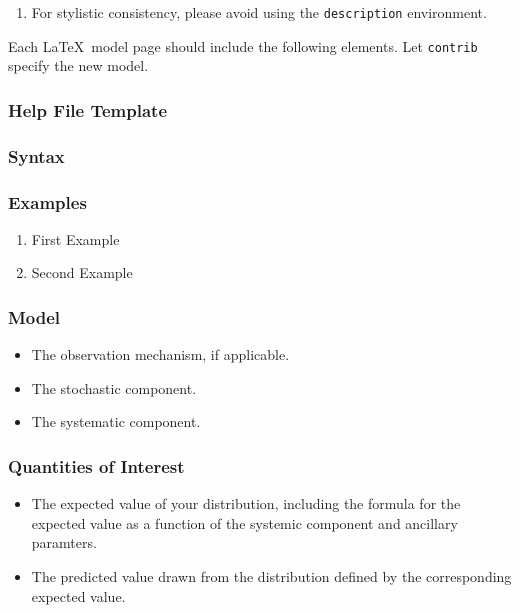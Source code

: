 \begin{description}
\begin{itemize}
\begin{enumerate}
		\item For stylistic consistency, please avoid using the {\tt description} environment.

\end{enumerate}



Each \LaTeX\ model page should include the following elements.  Let {\tt contrib} specify the new model.


\subsubsection*{Help File Template}


\subsubsection{Syntax}


\subsubsection{Examples}
\begin{enumerate}
\item First Example
\item Second Example
\end{enumerate}


\subsubsection{Model}
\begin{itemize}
\item The observation mechanism, if applicable.
\item The stochastic component.
\item The systematic component.
\end{itemize}


\subsubsection{Quantities of Interest}


\begin{itemize}

	\item The expected value of your distribution, including the formula for the expected value as a function of the systemic component and ancillary paramters.  

	\item The predicted value drawn from the distribution defined by the corresponding expected value.  


\end{itemize}
\end{itemize}
\end{description}
